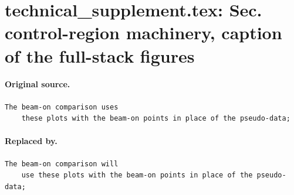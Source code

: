 \documentclass[11pt,a4paper]{article}
\begin{document}
\section{technical\_supplement.tex: Sec. control-region machinery, caption of the full-stack figures}
\paragraph{Original source.}
\begin{lstlisting}[language={[LaTeX]TeX},basicstyle=\ttfamily\footnotesize,columns=fullflexible]
The beam-on comparison uses
    these plots with the beam-on points in place of the pseudo-data;
\end{lstlisting}
\paragraph{Replaced by.}
\begin{lstlisting}[language={[LaTeX]TeX},basicstyle=\ttfamily\footnotesize,columns=fullflexible]
The beam-on comparison will
    use these plots with the beam-on points in place of the pseudo-data;
\end{lstlisting}
\end{document}
